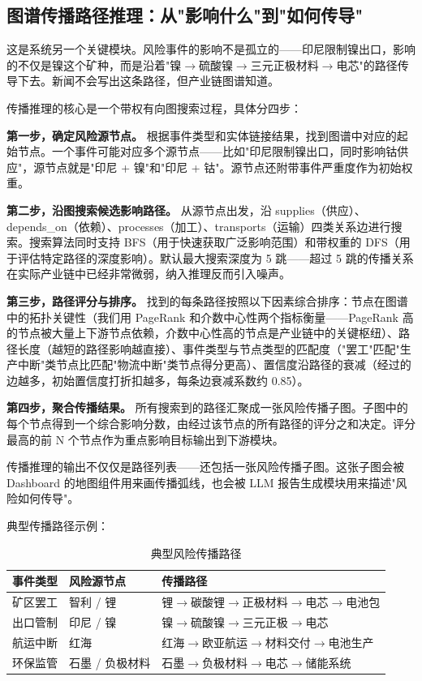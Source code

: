 \documentclass[12pt,a4paper]{ctexart}
\begin{document}
\subsection{图谱传播路径推理：从"影响什么"到"如何传导"}

这是系统另一个关键模块。风险事件的影响不是孤立的——印尼限制镍出口，影响的不仅是镍这个矿种，而是沿着"镍$\to$硫酸镍$\to$三元正极材料$\to$电芯"的路径传导下去。新闻不会写出这条路径，但产业链图谱知道。

传播推理的核心是一个带权有向图搜索过程，具体分四步：

\textbf{第一步，确定风险源节点。} 根据事件类型和实体链接结果，找到图谱中对应的起始节点。一个事件可能对应多个源节点——比如"印尼限制镍出口，同时影响钴供应"，源节点就是"印尼 + 镍"和"印尼 + 钴"。源节点还附带事件严重度作为初始权重。

\textbf{第二步，沿图搜索候选影响路径。} 从源节点出发，沿 supplies（供应）、depends\_on（依赖）、processes（加工）、transports（运输）四类关系边进行搜索。搜索算法同时支持 BFS（用于快速获取广泛影响范围）和带权重的 DFS（用于评估特定路径的深度影响）。默认最大搜索深度为 5 跳——超过 5 跳的传播关系在实际产业链中已经非常微弱，纳入推理反而引入噪声。

\textbf{第三步，路径评分与排序。} 找到的每条路径按照以下因素综合排序：节点在图谱中的拓扑关键性（我们用 PageRank 和介数中心性两个指标衡量——PageRank 高的节点被大量上下游节点依赖，介数中心性高的节点是产业链中的关键枢纽）、路径长度（越短的路径影响越直接）、事件类型与节点类型的匹配度（"罢工"匹配"生产中断"类节点比匹配"物流中断"类节点得分更高）、置信度沿路径的衰减（经过的边越多，初始置信度打折扣越多，每条边衰减系数约 0.85）。

\textbf{第四步，聚合传播结果。} 所有搜索到的路径汇聚成一张风险传播子图。子图中的每个节点得到一个综合影响分数，由经过该节点的所有路径的评分之和决定。评分最高的前 N 个节点作为重点影响目标输出到下游模块。

传播推理的输出不仅仅是路径列表——还包括一张风险传播子图。这张子图会被 Dashboard 的地图组件用来画传播弧线，也会被 LLM 报告生成模块用来描述"风险如何传导"。

典型传播路径示例：

\begin{table}[htbp]
\centering
\caption{典型风险传播路径}
\begin{tabularx}{\textwidth}{p{2.6cm}p{3.0cm}X}
\toprule
事件类型 & 风险源节点 & 传播路径 \\
\midrule
矿区罢工 & 智利 / 锂 & 锂$\to$碳酸锂$\to$正极材料$\to$电芯$\to$电池包 \\
出口管制 & 印尼 / 镍 & 镍$\to$硫酸镍$\to$三元正极$\to$电芯 \\
航运中断 & 红海 & 红海$\to$欧亚航运$\to$材料交付$\to$电池生产 \\
环保监管 & 石墨 / 负极材料 & 石墨$\to$负极材料$\to$电芯$\to$储能系统 \\
\bottomrule
\end{tabularx}
\end{table}
\end{document}
